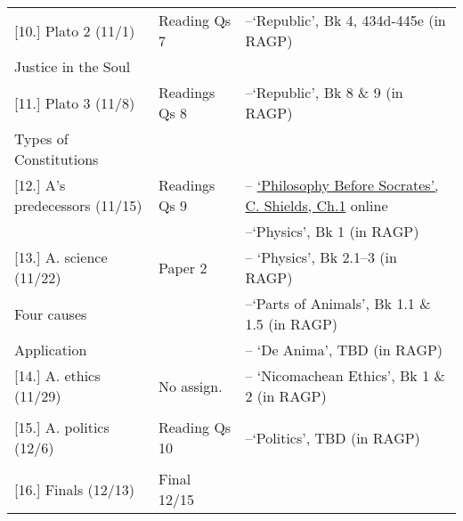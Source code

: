 \documentclass[article,oneside]{memoir}
\begin{document}
\begin{landscape}
\begin{center}
\begin{longtable}{p{8cm}p{4cm}p{8cm}}
[10.] Plato 2 (11/1)				& Reading Qs 7		&   --`Republic', Bk 4, 434d-445e (in RAGP) \\
Justice in the Soul	    			&					&   \\  [1.8\baselineskip] \hline

[11.] Plato 3 (11/8)				& Readings Qs 	8		& --`Republic', Bk 8 \& 9 (in RAGP)  \\ 	
Types of Constitutions                       & 					&   \\ [1.8\baselineskip] \hline
         			      
							
							
[12.] A's predecessors (11/15)			& Readings Qs 9 	& -- \href{https://scottoconnor.org/ancient/Shields2.pdf}{`Philosophy Before Socrates', C. Shields, Ch.1} online  \\ %
						 		&			& --`Physics', Bk 1 (in RAGP) \\ [1.8\baselineskip] \hline				

[13.] A. science  (11/22)				& Paper 2         & -- `Physics',  Bk 2.1--3 (in RAGP) \\  
Four causes	    			 		&				& --`Parts of Animals', Bk 1.1 \& 1.5 (in RAGP) \\
Application						&				& -- `De Anima', TBD (in RAGP) \\ [1.8\baselineskip] \hline


[14.] A. ethics	(11/29)				& No assign.	& -- `Nicomachean Ethics', Bk 1 \& 2 (in RAGP) \\
								&				& 	 \\ [1.8\baselineskip] \hline


[15.] A. politics	(12/6)				& Reading Qs 10	& --`Politics', TBD (in RAGP)  \\
								& 				& \\ [1.8\baselineskip] \hline

[16.] Finals (12/13)					& Final 12/15		& \\ [1.8\baselineskip] \hline
	

\end{longtable}
\end{center}
\end{landscape}
\end{document}
